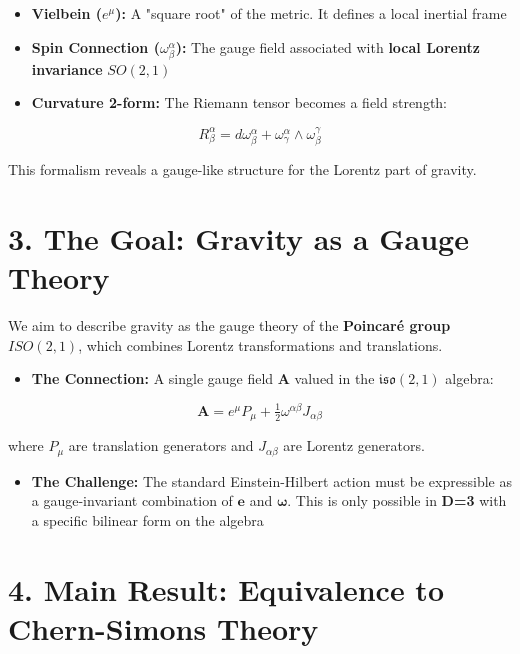 \documentclass[a0,portrait]{a0poster}
\begin{document}
\begin{multicols}{2}
\begin{itemize}
    \item \textbf{Vielbein ($e^\mu$):} A "square root" of the metric. It defines a local inertial frame
    \item \textbf{Spin Connection ($\omega^\alpha_\beta$):} The gauge field associated with \textbf{local Lorentz invariance} $SO(2,1)$
    \item \textbf{Curvature 2-form:} The Riemann tensor becomes a field strength:
\end{itemize}

\begin{equation*}
    R^\alpha_\beta = d\omega^\alpha_\beta + \omega^\alpha_\gamma \wedge \omega^\gamma_\beta
\end{equation*}

This formalism reveals a gauge-like structure for the Lorentz part of gravity.

\section*{3. The Goal: Gravity as a Gauge Theory}

We aim to describe gravity as the gauge theory of the \textbf{Poincaré group} $ISO(2,1)$, which combines Lorentz transformations and translations.

\begin{itemize}
    \item \textbf{The Connection:} A single gauge field $\mathbf{A}$ valued in the $\mathfrak{iso}(2,1)$ algebra:
\end{itemize}

\begin{equation*}
    \mathbf{A} = e^\mu P_\mu + \tfrac{1}{2} \omega^{\alpha\beta} J_{\alpha\beta}
\end{equation*}

where $P_\mu$ are translation generators and $J_{\alpha\beta}$ are Lorentz generators.

\begin{itemize}
    \item \textbf{The Challenge:} The standard Einstein-Hilbert action must be expressible as a gauge-invariant combination of $\mathbf{e}$ and $\boldsymbol{\omega}$. This is only possible in \textbf{D=3} with a specific bilinear form on the algebra
\end{itemize}

\section*{4. Main Result: Equivalence to Chern-Simons Theory}


\end{multicols}
\end{document}
